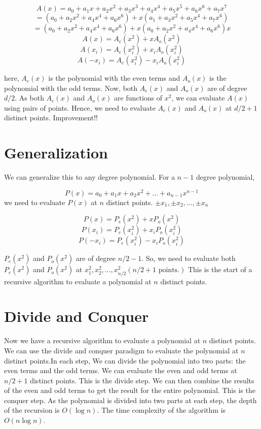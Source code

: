 \documentclass{report}
\begin{document}
    
	$$A(x) = a_0 + a_1x + a_2x^2 + a_3x^3 + a_4x^4 + a_5x^5 + a_6x^6 + a_7x^7$$
	$$ = (a_0 + a_2x^2 + a_4x^4 + a_6x^6) + x(a_1 + a_3x^2 + a_5x^4 + a_7x^6)$$
	$$ =  (a_0 + a_2x^2 + a_4x^4 + a_6x^6) + x(a_0 + a_2x^2 + a_4x^4 + a_6x^6)x $$
	$$A(x)= A_e(x^2) + xA_o(x^2)$$
	$$A(x_i) = A_e(x_i^2) + x_iA_o(x_i^2)$$
	$$A(-x_i) = A_e(x_i^2) - x_iA_o(x_i^2)$$

here, \(A_e(x)\) is the polynomial with the even terms and \(A_o(x)\) is the polynomial with the odd terms. Now, both \(A_e(x)\) and \(A_o(x)\) are of degree \(d/2\). 
As both \(A_e(x)\) and \(A_o(x)\) are functions of \(x^2\), we can evaluate \(A(x)\) using \pm pairs of points. Hence, we need to evaluate \(A_e(x)\) and \(A_o(x)\) at \(d/2 + 1\) distinct points. Improvement!!

\section{Generalization}
We can generalize this to any degree polynomial.
For a \(n-1\) degree polynomial, 

$$	P(x) = a_0 + a_1x + a_2x^2 + \ldots + a_{n-1}x^{n-1} $$
we need to evaluate \(P(x)\) at \(n\) distinct points. $\pm x_1,\pm x_2, \ldots, \pm x_n $

$$ P(x) = P_e(x^2) + xP_o(x^2)$$
$$ P(x_i) = P_e(x_i^2) + x_iP_o(x_i^2)$$
 $$P(-x_i) = P_e(x_i^2) - x_iP_o(x_i^2)$$

\(P_e(x^2)\) and \(P_o(x^2)\) are of degree \(n/2-1\).\newline
So, we need to evaluate both \(P_e(x^2)\) and \(P_o(x^2)\) at $ x_1^2, x_2^2, \ldots, x_{n/2}^2 (n/2 + 1 \text{ points.})$ \newline
This is the start of a recursive algorithm to evaluate a polynomial at \(n\) distinct points.

\section{Divide and Conquer}
Now we have a recursive algorithm to evaluate a polynomial at \(n\) distinct points. We can use the divide and conquer paradigm to evaluate the polynomial at \(n\) distinct points.In each step, We can divide the polynomial into two parts: the even terms and the odd terms. We can evaluate the even and odd terms at \(n/2 + 1\) distinct points. This is the divide step. We can then combine the results of the even and odd terms to get the result for the entire polynomial. This is the conquer step. As the polynomial is divided into two parts at each step, the depth of the recursion is \(O(\log n)\). The time complexity of the algorithm is \(O(n \log n)\).
\end{document}
